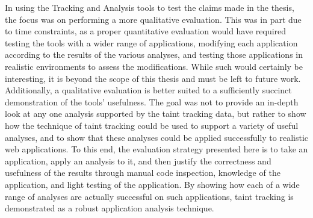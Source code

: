 \documentclass[msc,oneside]{ubcthesis}
\begin{document}
In using the Tracking and Analysis tools to test the claims made in the thesis, the focus was on performing a more qualitative evaluation. This was in part due to time constraints, as a proper quantitative evaluation would have required testing the tools with a wider range of applications, modifying each application according to the results of the various analyses, and testing those applications in realistic environments to assess the modifications. While such would certainly be interesting, it is beyond the scope of this thesis and must be left to future work. Additionally, a qualitative evaluation is better suited to a sufficiently succinct demonstration of the tools' usefulness. The goal was not to provide an in-depth look at any one analysis supported by the taint tracking data, but rather to show how the technique of taint tracking could be used to support a variety of useful analyses, and to show that these analyses could be applied successfully to realistic web applications. To this end, the evaluation strategy presented here is to take an application, apply an analysis to it, and then justify the correctness and usefulness of the results through manual code inspection, knowledge of the application, and light testing of the application. By showing how each of a wide range of analyses are actually successful on such applications, taint tracking is demonstrated as a robust application analysis technique.

 
\end{document}
